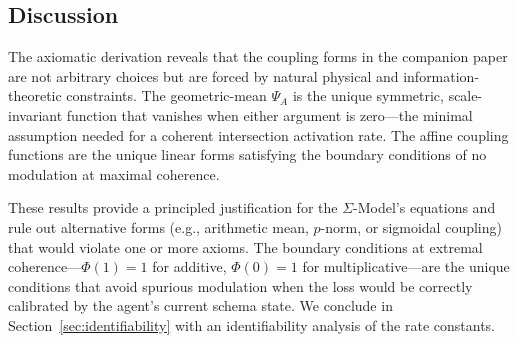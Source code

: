 \subsection{Discussion}

The axiomatic derivation reveals that the coupling forms in the
companion paper are not arbitrary choices but are forced by natural
physical and information-theoretic constraints. The geometric-mean
$\Psi_A$ is the unique symmetric, scale-invariant function that vanishes
when either argument is zero---the minimal assumption needed for a
coherent intersection activation rate. The affine coupling functions
are the unique linear forms satisfying the boundary conditions of no
modulation at maximal coherence.

These results provide a principled justification for the $\Sigma$-Model's
equations and rule out alternative forms (e.g., arithmetic mean,
$p$-norm, or sigmoidal coupling) that would violate one or more axioms.
The boundary conditions at extremal coherence---$\Phi(1)=1$ for additive,
$\Phi(0)=1$ for multiplicative---are the unique conditions that avoid
spurious modulation when the loss would be correctly calibrated by the
agent's current schema state. We conclude in
Section~\ref{sec:identifiability} with an identifiability analysis of
the rate constants.
